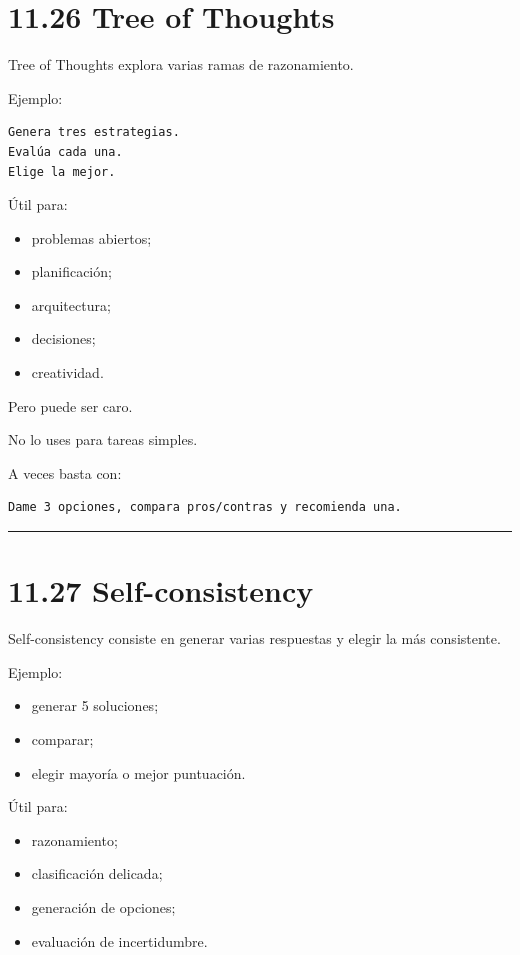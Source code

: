 \section{11.26 Tree of Thoughts}\label{tree-of-thoughts}

Tree of Thoughts explora varias ramas de razonamiento.

Ejemplo:

\begin{lstlisting}
Genera tres estrategias.
Evalúa cada una.
Elige la mejor.
\end{lstlisting}

Útil para:

\begin{itemize}
\tightlist
\item
  problemas abiertos;
\item
  planificación;
\item
  arquitectura;
\item
  decisiones;
\item
  creatividad.
\end{itemize}

Pero puede ser caro.

No lo uses para tareas simples.

A veces basta con:

\begin{lstlisting}
Dame 3 opciones, compara pros/contras y recomienda una.
\end{lstlisting}

\begin{center}\rule{0.5\linewidth}{0.5pt}\end{center}

\section{11.27 Self-consistency}\label{self-consistency}

Self-consistency consiste en generar varias respuestas y elegir la más
consistente.

Ejemplo:

\begin{itemize}
\tightlist
\item
  generar 5 soluciones;
\item
  comparar;
\item
  elegir mayoría o mejor puntuación.
\end{itemize}

Útil para:

\begin{itemize}
\tightlist
\item
  razonamiento;
\item
  clasificación delicada;
\item
  generación de opciones;
\item
  evaluación de incertidumbre.
\end{itemize}

